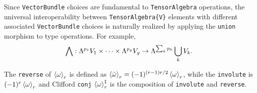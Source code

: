 \documentclass{juliacon}
\begin{document}


Since \verb`VectorBundle` choices are fundamental to \verb`TensorAlgebra` operations, the universal interoperability between \verb`TensorAlgebra{V}` elements with different associated \verb`VectorBundle` choices is naturally realized by applying the \verb`union` morphism to type operations.
For example, $$\bigwedge :\Lambda^{p_1}V_1\times\dots\times\Lambda^{p_g}V_g \rightarrow \Lambda^{\sum_kp_k}\bigcup_k V_k.$$

\begin{definition}
	The \verb`reverse` of $\left\langle \omega \right\rangle_r$ is defined as $\left\langle \tilde\omega \right\rangle_r = (-1)^{(r-1)r/2}\left\langle \omega \right\rangle_r$, while the \verb`involute` is $(-1)^r\left\langle \omega \right\rangle_r$ and Clifford \verb`conj`  $\left\langle \omega \right\rangle_r^\ddagger$ is the composition of \verb`involute` and \verb`reverse`.
\end{definition}
\end{document}
